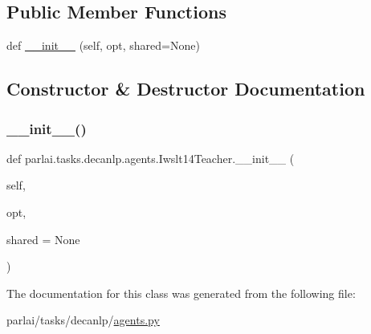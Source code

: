 \subsection*{Public Member Functions}
\begin{DoxyCompactItemize}
\item 
def \hyperlink{classparlai_1_1tasks_1_1decanlp_1_1agents_1_1Iwslt14Teacher_ab5be25b3d68b4bbaa180c280c67a7946}{\+\_\+\+\_\+init\+\_\+\+\_\+} (self, opt, shared=None)
\end{DoxyCompactItemize}


\subsection{Constructor \& Destructor Documentation}
\mbox{\label{classparlai_1_1tasks_1_1decanlp_1_1agents_1_1Iwslt14Teacher_ab5be25b3d68b4bbaa180c280c67a7946}} 
\subsubsection{\texorpdfstring{\+\_\+\+\_\+init\+\_\+\+\_\+()}{\_\_init\_\_()}}
{\footnotesize\ttfamily def parlai.\+tasks.\+decanlp.\+agents.\+Iwslt14\+Teacher.\+\_\+\+\_\+init\+\_\+\+\_\+ (\begin{DoxyParamCaption}\item[{}]{self,  }\item[{}]{opt,  }\item[{}]{shared = {\ttfamily None} }\end{DoxyParamCaption})}



The documentation for this class was generated from the following file\+:\begin{DoxyCompactItemize}
\item 
parlai/tasks/decanlp/\hyperlink{parlai_2tasks_2decanlp_2agents_8py}{agents.\+py}\end{DoxyCompactItemize}
